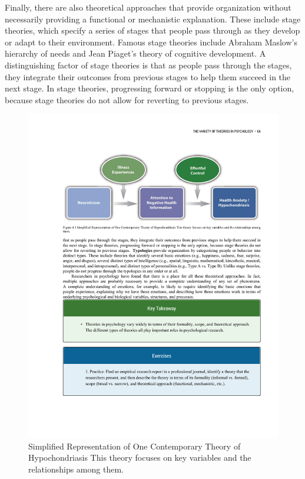 Finally, there are also theoretical approaches that provide organization without necessarily providing a functional or mechanistic explanation. These include stage theories, which specify a series of stages that people pass through as they develop or adapt to their environment. Famous stage theories include Abraham Maslow's hierarchy of needs and Jean Piaget's theory of cognitive development. A distinguishing factor of stage theories is that as people pass through the stages, they integrate their outcomes from previous stages to help them succeed in the next stage. In stage theories, progressing forward or stopping is the only option, because stage theories do not allow for reverting to previous stages.


\begin{figure}
      \includegraphics[width=\linewidth]{figures/C4Hypo.pdf}
      \caption{Simplified Representation of One Contemporary Theory of Hypochondriasis This theory focuses on key variables and the relationships among them.
}
      \label{fig:Hypo}
\end{figure}

